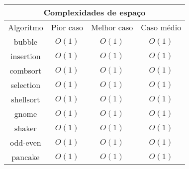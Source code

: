 \begin{center}
\begin{tabular}{||c|c|c|c||}
\hline
\multicolumn{4}{|c|}{Complexidades de espaço} \\
\hline
Algoritmo & Pior caso & Melhor caso & Caso médio \\
\hline
bubble      & $O(1)$ & $O(1)$ & $O(1)$ \\
insertion   & $O(1)$ & $O(1)$ & $O(1)$ \\
combsort    & $O(1)$ & $O(1)$ & $O(1)$ \\
selection   & $O(1)$ & $O(1)$ & $O(1)$ \\
shellsort   & $O(1)$ & $O(1)$ & $O(1)$ \\
gnome       & $O(1)$ & $O(1)$ & $O(1)$ \\
shaker      & $O(1)$ & $O(1)$ & $O(1)$ \\
odd-even    & $O(1)$ & $O(1)$ & $O(1)$ \\
pancake     & $O(1)$ & $O(1)$ & $O(1)$ \\
\hline
\end{tabular}
\end{center}




